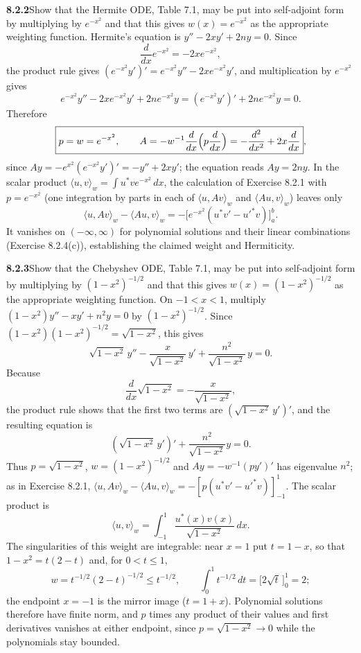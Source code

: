 \par\bigskip
\noindent\textbf{8.2.2}\quad Show that the Hermite ODE, Table 7.1, may be put
into self-adjoint form by multiplying by $e^{-x^{2}}$ and that this gives
$w(x)=e^{-x^{2}}$ as the appropriate weighting function.
\solution
Hermite's equation is $y''-2xy'+2ny=0$.  Since
\[
\frac{d}{dx}e^{-x^2}=-2xe^{-x^2},
\]
the product rule gives $(e^{-x^2}y')'=e^{-x^2}y''-2xe^{-x^2}y'$, and
multiplication by $e^{-x^2}$ gives
\[
e^{-x^2}y''-2xe^{-x^2}y'+2ne^{-x^2}y
=(e^{-x^2}y')'+2ne^{-x^2}y=0.
\]
Therefore
\[
\boxed{p=w=e^{-x^2},\qquad
A=-w^{-1}\frac{d}{dx}\Bigl(p\frac{d}{dx}\Bigr)
=-\frac{d^2}{dx^2}+2x\frac{d}{dx}},
\]
since $Ay=-e^{x^2}(e^{-x^2}y')'=-y''+2xy'$; the equation reads
$Ay=2ny$.  In the scalar product
$\langle u,v\rangle_w=\int u^*v e^{-x^2}\,dx$, the calculation of
Exercise 8.2.1 with $p=e^{-x^2}$ (one integration by parts in each of
$\langle u,Av\rangle_w$ and $\langle Au,v\rangle_w$) leaves only
\[
\langle u,Av\rangle_w-\langle Au,v\rangle_w
=-\bigl[e^{-x^2}(u^*v'-u'^*v)\bigr]_a^b.
\]
It vanishes on $(-\infty,\infty)$ for polynomial solutions and their
linear combinations (Exercise 8.2.4(c)), establishing the claimed
weight and Hermiticity.


\par\bigskip
\noindent\textbf{8.2.3}\quad Show that the Chebyshev ODE, Table 7.1, may be
put into self-adjoint form by multiplying by $(1-x^{2})^{-1/2}$ and that this
gives $w(x)=(1-x^{2})^{-1/2}$ as the appropriate weighting function.
\solution
On $-1<x<1$, multiply $(1-x^2)y''-xy'+n^2y=0$ by
$(1-x^2)^{-1/2}$.  Since $(1-x^2)(1-x^2)^{-1/2}=\sqrt{1-x^2}$, this
gives
\[
\sqrt{1-x^2}\,y''-\frac{x}{\sqrt{1-x^2}}\,y'
+\frac{n^2}{\sqrt{1-x^2}}\,y=0.
\]
Because
\[
\frac{d}{dx}\sqrt{1-x^2}=-\frac{x}{\sqrt{1-x^2}},
\]
the product rule shows that the first two terms are
$(\sqrt{1-x^2}\,y')'$, and the resulting equation is
\[
\boxed{\left(\sqrt{1-x^2}\,y'\right)'
       +\frac{n^2}{\sqrt{1-x^2}}y=0}.
\]
Thus $p=\sqrt{1-x^2}$, $w=(1-x^2)^{-1/2}$ and
$Ay=-w^{-1}(py')'$ has eigenvalue $n^2$; as in Exercise 8.2.1,
$\langle u,Av\rangle_w-\langle Au,v\rangle_w
=-[p(u^*v'-u'^*v)]_{-1}^{1}$.
The scalar product is
\[
\boxed{\langle u,v\rangle_w=
\int_{-1}^{1}\frac{u^*(x)v(x)}{\sqrt{1-x^2}}\,dx}.
\]
The singularities of this weight are integrable: near $x=1$ put
$t=1-x$, so that $1-x^2=t(2-t)$ and, for $0<t\le1$,
\[
w=t^{-1/2}(2-t)^{-1/2}\le t^{-1/2},\qquad
\int_0^1t^{-1/2}\,dt=\bigl[2\sqrt t\,\bigr]_0^1=2;
\]
the endpoint $x=-1$ is the mirror image ($t=1+x$).  Polynomial
solutions therefore have finite norm, and $p$ times any product of
their values and first derivatives vanishes at either endpoint, since
$p=\sqrt{1-x^2}\to0$ while the polynomials stay bounded.


